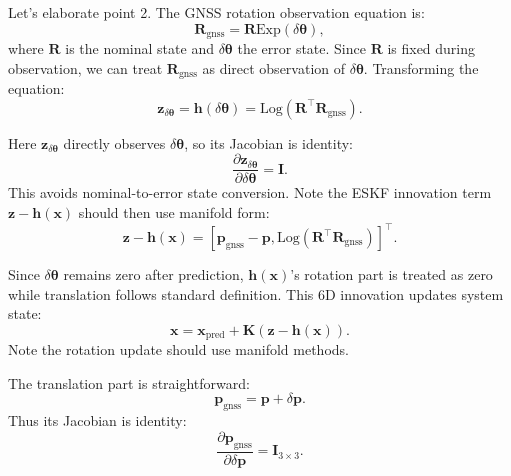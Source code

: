 Let's elaborate point 2. The GNSS rotation observation equation is:
\begin{equation}\label{eq:obs-gnss}
	\bm{R}_{\mathrm{gnss}} = \bm{R} \mathrm{Exp}(\delta \boldsymbol{\theta}),
\end{equation}
where $\bm{R}$ is the nominal state and $\delta \boldsymbol{\theta}$ the error state. Since $\bm{R}$ is fixed during observation, we can treat $\bm{R}_{\mathrm{gnss}}$ as direct observation of $\delta \boldsymbol{\theta}$. Transforming the equation:
\begin{equation}
\bm{z}_{\delta \boldsymbol{\theta}} = \bm{h}(\delta \boldsymbol{\theta}) = \mathrm{Log} 
\left(\bm{R}^\top \bm{R}_{\mathrm{gnss}} \right).
\end{equation}
	
Here $\bm{z}_{\delta \boldsymbol{\theta}}$ directly observes $\delta \boldsymbol{\theta}$, so its Jacobian is identity:
\begin{equation}\label{eq:error-jacobian}
\frac{\partial \bm{z}_{\delta \boldsymbol{\theta}}}{\partial \delta \boldsymbol{\theta}} = \bm{I}.
\end{equation}
This avoids nominal-to-error state conversion. Note the ESKF innovation term $\bm{z}-\bm{h}(\bm{x})$ should then use manifold form:
\begin{equation}\label{eq:manifold-innovation}
\bm{z} - \bm{h}(\bm{x}) = [\bm{p}_{\mathrm{gnss}} - \bm{p}, 
\mathrm{Log}(\bm{R}^\top \bm{R}_{\mathrm{gnss}})]^\top.
\end{equation}

Since $\delta \boldsymbol{\theta}$ remains zero after prediction, $\bm{h} (\bm{x})$'s rotation part is treated as zero while translation follows standard definition. This 6D innovation updates system state:
\begin{equation}\label{eq:state-update}
\bm{x} = \bm{x}_{\text{pred}} + \bm{K} (\bm{z} - \bm{h}(\bm{x})).
\end{equation}
Note the rotation update should use manifold methods.

The translation part is straightforward:
\begin{equation}\label{eq:translation-update}
\bm{p}_{\mathrm{gnss}} = \bm{p} + \delta \bm{p}.
\end{equation}
Thus its Jacobian is identity:
\begin{equation}\label{eq:trans-jacobian}
\frac{\partial \bm{p}_{\mathrm{gnss}}}{\partial \delta \bm{p}} = \bm{I}_{3 \times 3}.
\end{equation}

